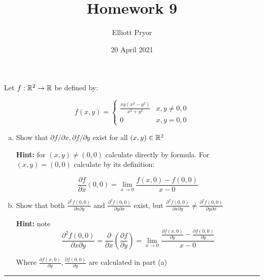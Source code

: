 \documentclass[11pt]{article}
\title{Homework 9}
\author{Elliott Pryor}
\date{20 April 2021}
\begin{document}
\maketitle


Let $f: \mathbb{R} ^2 \to \mathbb{R}$ be defined by:

$$f(x,y) = \begin{cases}
    \frac{xy(x^2-y^2)}{x^2 + y^2} & x,y \neq 0,0 \\
    0 & x, y = 0, 0
\end{cases}$$

\begin{enumerate}[(a)]
    \item Show that $\partial f / \partial x, \partial f / \partial y$ exist for all $(x, y) \in \mathbb{R} ^2$
    
    \textbf{Hint: } for $(x,y) \neq (0,0)$ calculate directly by formula. For $(x, y) = (0,0)$ calculate by its definition:

    $$\frac{\partial f}{\partial x}(0,0) = \lim_{x \to 0} \frac{f(x, 0) - f(0,0)}{x-0}$$

    \item Show that both $\frac{\partial ^2 f(0,0)}{\partial x \partial y}$ and $\frac{\partial ^2 f(0,0)}{\partial y \partial x}$
    exist, but $\frac{\partial ^2 f(0,0)}{\partial x \partial y} \neq \frac{\partial ^2 f(0,0)}{\partial y \partial x}$

    \textbf{Hint:} note
    $$\frac{\partial ^2 f(0,0)}{\partial x \partial y} = 
    \frac{\partial}{\partial x} \left( \frac{\partial f}{\partial y} \right) = 
    \lim_{x \to 0} \frac{\frac{\partial f(x,0)}{\partial y} - \frac{\partial f(0,0)}{\partial y}}{x - 0}$$

    Where $\frac{\partial f(x,0)}{\partial y}, \frac{\partial f(0,0)}{\partial y}$ are calculated in part (a)

\end{enumerate}
\hrule
\end{document}
